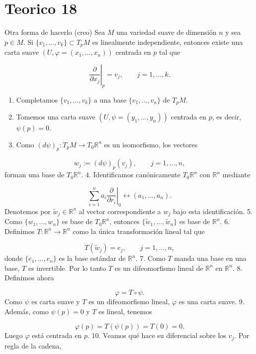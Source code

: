 \section{Teorico 18}
\begin{booklemma}{Otra forma de hacerlo (creo)}
Sea $M$ una variedad suave de dimensión $n$ y sea $p\in M$. Si $\{v_1,\ldots,v_k\}\subset T_pM$ es linealmente independiente, entonces existe una carta suave $(U,\varphi=(x_1,\ldots,x_n))$ centrada en $p$ tal que

\[
\left.\frac{\partial}{\partial x_j}\right|_p=v_j,\qquad j=1,\ldots,k.
\]
\end{booklemma}
\begin{bookproof}{}
\begin{enumerate}
\item Completamos $\{v_1,\ldots,v_k\}$ a una base $\{v_1,\ldots,v_n\}$ de $T_pM$.
\item Tomemos una carta suave $(U,\psi=(y_1,\ldots,y_n))$ centrada en $p$, es decir, $\psi(p)=0$.
\item Como $(d\psi)_p:T_pM\to T_0\mathbb R^n$ es un isomorfismo, los vectores
\end{enumerate}
\[
w_j:=(d\psi)_p(v_j),\qquad j=1,\ldots,n,
\]
forman una base de $T_0\mathbb R^n$. 4. Identificamos canónicamente $T_0\mathbb R^n$ con $\mathbb R^n$ mediante

\[
\sum_{i=1}^n a_i\left.\frac{\partial}{\partial r_i}\right|_0\longleftrightarrow (a_1,\ldots,a_n).
\]
Denotemos por $\widetilde w_j\in\mathbb R^n$ al vector correspondiente a $w_j$ bajo esta identificación. 5. Como $\{w_1,\ldots,w_n\}$ es base de $T_0\mathbb R^n$, entonces $\{\widetilde w_1,\ldots,\widetilde w_n\}$ es base de $\mathbb R^n$. 6. Definimos $T:\mathbb R^n\to\mathbb R^n$ como la única transformación lineal tal que

\[
T(\widetilde w_j)=e_j,\qquad j=1,\ldots,n,
\]
donde $\{e_1,\ldots,e_n\}$ es la base estándar de $\mathbb R^n$. 7. Como $T$ manda una base en una base, $T$ es invertible. Por lo tanto $T$ es un difeomorfismo lineal de $\mathbb R^n$ en $\mathbb R^n$. 8. Definimos ahora

\[
\varphi=T\circ\psi.
\]
Como $\psi$ es carta suave y $T$ es un difeomorfismo lineal, $\varphi$ es una carta suave. 9. Además, como $\psi(p)=0$ y $T$ es lineal, tenemos

\[
\varphi(p)=T(\psi(p))=T(0)=0.
\]
Luego $\varphi$ está centrada en $p$. 10. Veamos qué hace su diferencial sobre los $v_j$. Por regla de la cadena,


\end{bookproof}
